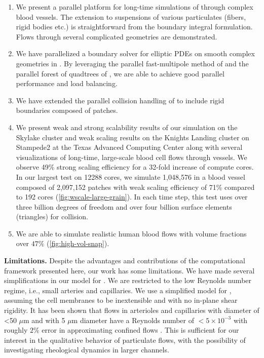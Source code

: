 \begin{enumerate}
  \item We present a parallel platform for long-time simulations of \rbcs through complex blood vessels.
    The extension to suspensions of various particulates (fibers, rigid bodies etc.) is straightforward from the boundary integral formulation. 
    Flows through several complicated geometries are demonstrated.
  \item We have parallelized a boundary solver for elliptic PDEs on smooth complex geometries in \threed. 
    By leveraging the parallel fast-multipole method of \cite{malhotra2015} and the parallel forest of quadtrees of \cite{BursteddeWilcoxGhattas11}, we are able to achieve good parallel performance and load balancing.
  \item We have extended the parallel collision handling of \cite{lu2018parallel} to include rigid \threed boundaries composed of patches. 
  \item We present weak and strong scalability results of our
    simulation on the Skylake cluster and weak scaling results on the
    Knights Landing cluster on Stampede2 at the Texas Advanced
    Computing Center along with several visualizations of long-time,
    large-scale blood cell flows through vessels.
    We observe %
    49\% strong scaling efficiency for a 32-fold increase of compute
    cores. 
    In our largest test on 12288 cores, we simulate 1,048,576 \rbcs in
    a blood vessel composed of 2,097,152
    patches with weak scaling efficiency of 71\% compared to 192 cores
    (\cref{fig:wscale-large-grain}). In each time step, this test uses
    over three billion degrees of freedom
    and over four billion surface elements (triangles) for collision.
  \item We are able to simulate realistic human blood flows with \rbc volume
    fractions over $47\%$ (\cref{fig:high-vol-snap}).

\end{enumerate}
\textbf{Limitations. }
Despite the advantages and contributions of the computational framework presented
here, our work has some limitations.
We have made several simplifications in our model for \rbcs. 
We are restricted to the low Reynolds number regime, i.e., small arteries and capillaries. 
We use a simplified model for \rbcs, assuming the cell membranes to be inextensible
and with no in-plane shear rigidity.
It has been shown that flows in arterioles and capillaries with
diameter of <50 $\mu$m and \rbcs with 5 $\mu$m diameter have a
Reynolds number of $<5 \times 10^{-3}$ \cite{wang2013simulation}\cite[Section 5.4]{caro2012mechanics} with roughly $2$\% error in approximating confined flows \cite{al2008motion}. 
This is sufficient for our interest in the qualitative behavior of particulate flows, with the possibility of investigating rheological dynamics in larger channels.

